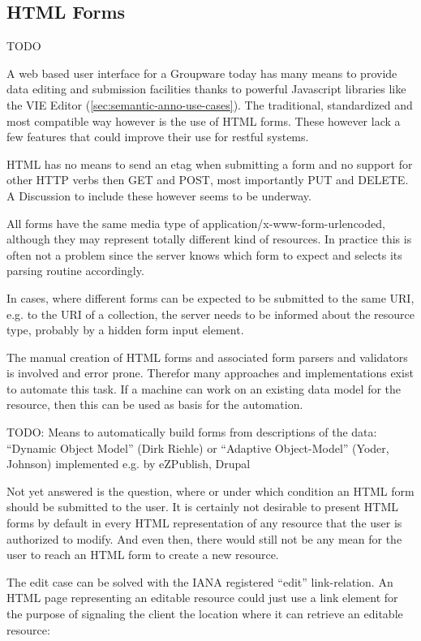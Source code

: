 \documentclass[12pt,a4paper,twoside]{scrartcl}		%
\begin{document}
\subsection{HTML Forms}
\label{sec:html-forms}
TODO

A web based user interface for a Groupware today has many means to provide data
editing and submission facilities thanks to powerful Javascript libraries like
the VIE Editor (\autoref{sec:semantic-anno-use-cases}). The traditional,
standardized and most compatible way however is the use of HTML forms. These
however lack a few features that could improve their use for restful systems.

HTML has no means to send an etag when submitting a form and no support for
other HTTP verbs then GET and POST, most importantly PUT and DELETE. A
Discussion to include these however seems to be underway\cite{Amundsen2011}.

All forms have the same media type of application/x-www-form-urlencoded,
although they may represent totally different kind of resources. In practice
this is often not a problem since the server knows which form to expect and
selects its parsing routine accordingly.

In cases, where different forms can be expected to be submitted to the same URI,
e.g. to the URI of a collection, the server needs to be informed about the
resource type, probably by a hidden form input element.

The manual creation of HTML forms and associated form parsers and validators is
involved and error prone. Therefor many approaches and implementations exist to
automate this task. If a machine can work on an existing data model for the
resource, then this can be used as basis for the automation.

TODO: Means to automatically build forms from descriptions of the data:
``Dynamic Object Model'' (Dirk Riehle) or ``Adaptive Object-Model'' (Yoder,
Johnson) implemented e.g. by eZPublish, Drupal

Not yet answered is the question, where or under which condition an HTML form
should be submitted to the user. It is certainly not desirable to present HTML
forms by default in every HTML representation of any resource that the user is
authorized to modify. And even then, there would still not be any mean for the
user to reach an HTML form to create a new resource.

The edit case can be solved with the IANA registered ``edit'' link-relation. An
HTML page representing an editable resource could just use a link element for
the purpose of signaling the client the location where it can retrieve an
editable resource:
\end{document}
